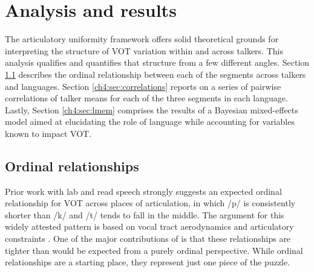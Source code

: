 \section{Analysis and results}

The articulatory uniformity framework offers solid theoretical grounds for interpreting the structure of VOT variation within and across talkers. This analysis qualifies and quantifies that structure from a few different angles. Section \ref{ch4:sec:ordrel} describes the ordinal relationship between each of the segments across talkers and languages. Section \ref{ch4:sec:correlations} reports on a series of pairwise correlations of talker means for each of the three segments in each language. Lastly, Section \ref{ch4:sec:lmem} comprises the results of a Bayesian mixed-effects model aimed at elucidating the role of language while accounting for variables known to impact VOT.

\subsection{Ordinal relationships}\label{ch4:sec:ordrel}

Prior work with lab and read speech strongly suggests an expected ordinal relationship for VOT across places of articulation, in which /p/ is consistently shorter than /k/ and /t/ tends to fall in the middle. The argument for this widely attested pattern is based on vocal tract aerodynamics and articulatory constraints \citep{cho_1999_vot}. One of the major contributions of \citet{chodroff_2017_structure} is that these relationships are tighter than would be expected from a purely ordinal perspective. While ordinal relationships are a starting place, they represent just one piece of the puzzle. 

